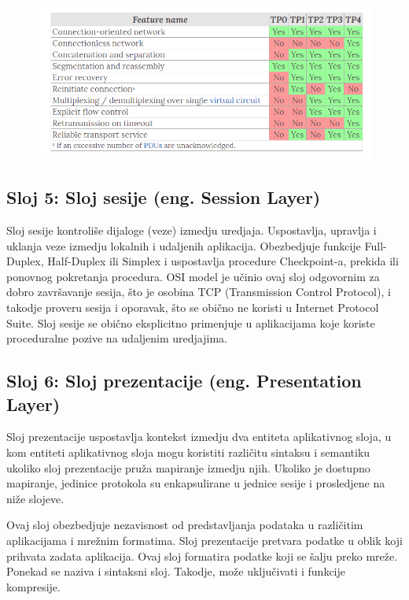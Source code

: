 \documentclass[a4paper,12pt, master]{etf}
\begin{document}
	\begin{figure}[h!]
		\centering
		\includegraphics[scale=.45]{../pic/tp_classes.png}
		\label{fig:tp_classes}
	\end{figure}

	\subsection{Sloj 5: Sloj sesije (eng\@. Session Layer)}

	Sloj sesije kontroli\v{s}e dijaloge (veze) izmedju uredjaja. Uspostavlja,
	upravlja i uklanja veze izmedju lokalnih i udaljenih aplikacija.
	Obezbedjuje funkcije Full-Duplex, Half-Duplex ili Simplex i uspostavlja
	procedure Checkpoint-a, prekida ili ponovnog pokretanja procedura. OSI
	model je u\v{c}inio ovaj sloj odgovornim za dobro zavr\v{s}avanje sesija,
	\v{s}to je osobina TCP (Transmission Control Protocol), i takodje proveru
	sesija i oporavak, \v{s}to se obi\v{c}no ne koristi u Internet Protocol
	Suite. Sloj sesije se obi\v{c}no eksplicitno primenjuje u aplikacijama koje
	koriste proceduralne pozive na udaljenim uredjajima.

	\subsection{Sloj 6: Sloj prezentacije (eng\@. Presentation Layer)}

	Sloj prezentacije uspostavlja kontekst izmedju dva entiteta aplikativnog
	sloja, u kom entiteti aplikativnog sloja mogu koristiti razli\v{c}itu
	sintaksu i semantiku ukoliko sloj prezentacije pru\v{z}a mapiranje izmedju
	njih. Ukoliko je dostupno mapiranje, jedinice protokola su enkapsulirane u
	jednice sesije i prosledjene na ni\v{z}e slojeve.

	Ovaj sloj obezbedjuje nezavisnost od predstavljanja podataka u
	razli\v{c}itim aplikacijama i mre\v{z}nim formatima. Sloj prezentacije
	pretvara podatke u oblik koji prihvata zadata aplikacija. Ovaj sloj
	formatira podatke koji se \v{s}alju preko mre\v{z}e. Ponekad se naziva i
	sintaksni sloj.	Takodje, mo\v{z}e uklju\v{c}ivati i funkcije kompresije.
\end{document}
